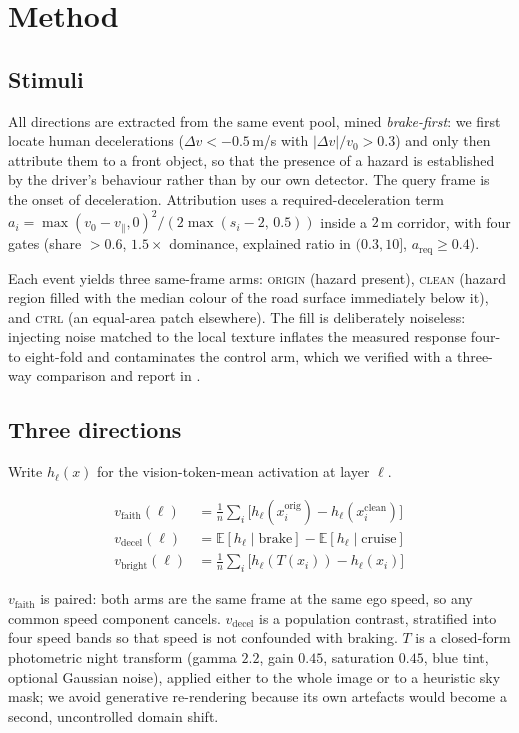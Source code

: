 \section{Method}
\label{sec:method}

\subsection{Stimuli}
\label{sec:stimuli}

All directions are extracted from the same event pool, mined \emph{brake-first}: we first
locate human decelerations ($\Delta v < -0.5$\,m/s with $|\Delta v|/v_0 > 0.3$) and only then
attribute them to a front object, so that the presence of a hazard is established by the
driver's behaviour rather than by our own detector. The query frame is the onset of
deceleration. Attribution uses a required-deceleration term
$a_i = \max(v_0 - v_{\parallel}, 0)^2 / (2\max(s_i - 2,\,0.5))$ inside a $2$\,m corridor, with
four gates (share $>0.6$, $1.5\times$ dominance, explained ratio in $(0.3,10]$,
$a_{\mathrm{req}} \ge 0.4$).

Each event yields three same-frame arms: \textsc{origin} (hazard present), \textsc{clean}
(hazard region filled with the median colour of the road surface immediately below it), and
\textsc{ctrl} (an equal-area patch elsewhere). The fill is deliberately noiseless: injecting
noise matched to the local texture inflates the measured response four- to eight-fold and
contaminates the control arm, which we verified with a three-way comparison and report in
.

\subsection{Three directions}
\label{sec:directions}

Write $h_\ell(x)$ for the vision-token-mean activation at layer $\ell$.

\begin{align}
v_{\mathrm{faith}}(\ell) &= \textstyle\frac{1}{n}\sum_i\big[h_\ell(x_i^{\mathrm{orig}}) - h_\ell(x_i^{\mathrm{clean}})\big] \\
v_{\mathrm{decel}}(\ell) &= \mathbb{E}[h_\ell \mid \text{brake}] - \mathbb{E}[h_\ell \mid \text{cruise}] \\
v_{\mathrm{bright}}(\ell) &= \textstyle\frac{1}{n}\sum_i\big[h_\ell(T(x_i)) - h_\ell(x_i)\big]
\end{align}

$v_{\mathrm{faith}}$ is paired: both arms are the same frame at the same ego speed, so any
common speed component cancels. $v_{\mathrm{decel}}$ is a population contrast, stratified into
four speed bands so that speed is not confounded with braking. $T$ is a closed-form photometric
night transform (gamma $2.2$, gain $0.45$, saturation $0.45$, blue tint, optional Gaussian
noise), applied either to the whole image or to a heuristic sky mask; we avoid generative
re-rendering because its own artefacts would become a second, uncontrolled domain shift.

